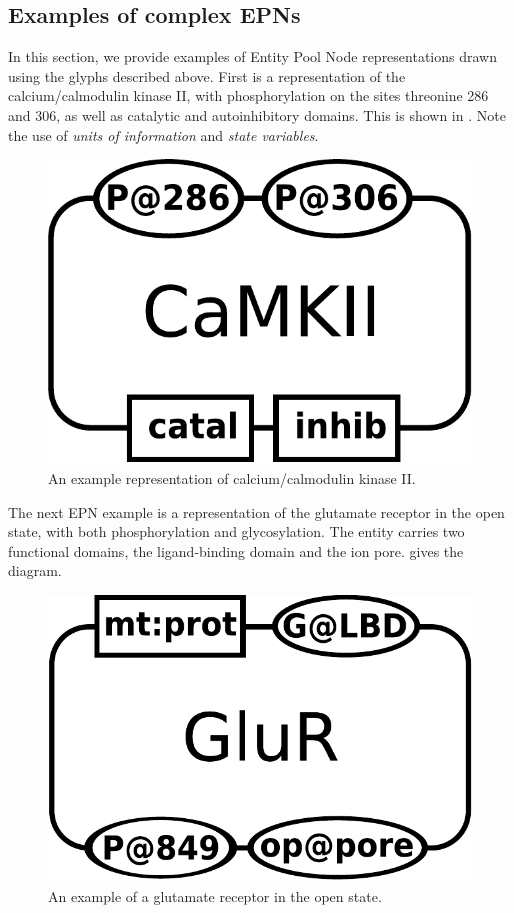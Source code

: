 
\subsection{Examples of complex EPNs}
\label{sec:CplxEPNs}

In this section, we provide examples of Entity Pool Node representations drawn using the \SBGNPDLone glyphs described above.  First is a representation of the calcium/calmodulin kinase II, with phosphorylation on the sites threonine 286 and 306, as well as catalytic and autoinhibitory domains.  This is shown in .  Note the use of \emph{units of information} and \emph{state variables}.

\begin{figure}[H]
  \centering
  \includegraphics[scale = 0.3]{examples/macromolecule-CaMKII}
  \caption{An example representation of calcium/calmodulin kinase II.}
  \label{fig:example-camkii}
\end{figure}

The next EPN example is a representation of the glutamate receptor in the open state, with both phosphorylation and glycosylation.  The entity carries two functional domains, the ligand-binding domain and the ion pore.   gives the diagram.

\begin{figure}[H]
  \centering
  \includegraphics[scale = 0.3]{examples/macromolecule-GluR}
  \caption{An example of a glutamate receptor in the open state.}
  \label{fig:example-glur}
\end{figure}




